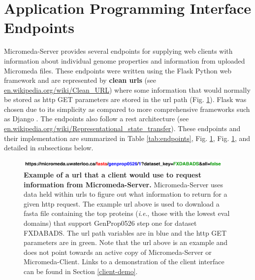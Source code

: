 \section{Application Programming Interface Endpoints} \label{endpoints}

Micromeda-Server provides several endpoints for supplying web clients with 
information about individual genome properties and information from uploaded 
Micromeda files. These endpoints were written using the Flask Python web 
framework \cite{grinberg2018flask} and are represented by \textbf{clean 
\gls{url}s} (see 
\href{http://en.wikipedia.org/wiki/Clean_URL}{en.wikipedia.org/wiki/Clean\_URL}) 
where some information that would normally be stored as \gls{http} GET 
parameters are stored in the \gls{url} path (Fig. \ref{fig:endpoint-url}). Flask 
was chosen due to its simplicity as compared to more comprehensive frameworks 
such as Django \cite{holovaty2009definitive}. The endpoints also follow a 
\gls{rest} architecture \cite{fielding2000representational} (see 
\href{http://en.wikipedia.org/wiki/Representational_state_transfer}{en.wikipedia.org/wiki/Representational\_state\_transfer}). 
These endpoints and their implementation are summarized in Table 
\ref{tab:endpoints}, Fig. \ref{endpoints}, Fig. \ref{fig:endpoint-url}, and 
detailed in subsections below.

\begin{figure}[!ht]
  \centering
	\includegraphics[width=0.95\textwidth]{media/Coloured-Endpoint.pdf}
     \caption[Example of a URL that a client would use to request information 
from Micromeda-Server.]{\textbf{Example of a \gls{url} that a client would use 
to request information from Micromeda-Server.} Micromeda-Server uses data held 
within \gls{url}s to figure out what information to return for a given 
\gls{http} request. The example \gls{url} above is used to download a 
\gls{fasta} file containing the top proteins (\textit{i}.\textit{e}., those with 
the lowest \gls{eval}  domains) that support GenProp0526 step one for dataset 
FXDABADS. The \gls{url} path variables are in blue and the \gls{http} GET 
parameters are in green. Note that the \gls{url} above is an example and does 
not point towards an active copy of Micromeda-Server or Micromeda-Client. Links 
to a demonstration of the client interface can be found in Section 
\ref{client-demo}.}
	 \label{fig:endpoint-url}
\end{figure}

